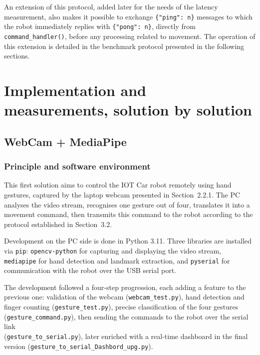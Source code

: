 \documentclass[12pt,a4paper]{report}
\begin{document}
	An extension of this protocol, added later for the needs of the latency measurement, also makes it possible to exchange \texttt{\{"ping": n\}} messages to which the robot immediately replies with \texttt{\{"pong": n\}}, directly from \texttt{command\_handler()}, before any processing related to movement. The operation of this extension is detailed in the benchmark protocol presented in the following sections.
	
	\newpage
	
	
\chapter{Implementation and measurements, solution by solution}
	\section{WebCam + MediaPipe}
	
	\subsection*{Principle and software environment}
	
	This first solution aims to control the IOT Car robot remotely using hand gestures, captured by the laptop webcam presented in Section~2.2.1. The PC analyses the video stream, recognises one gesture out of four, translates it into a movement command, then transmits this command to the robot according to the protocol established in Section~3.2.
	
	Development on the PC side is done in Python 3.11. Three libraries are installed via \texttt{pip}: \texttt{opencv-python} for capturing and displaying the video stream, \texttt{mediapipe} for hand detection and landmark extraction, and \texttt{pyserial} for communication with the robot over the USB serial port.
	
	The development followed a four-step progression, each adding a feature to the previous one: validation of the webcam (\texttt{webcam\_test.py}), hand detection and finger counting (\texttt{gesture\_test.py}), precise classification of the four gestures (\texttt{gesture\_command.py}), then sending the commands to the robot over the serial link \\ (\texttt{gesture\_to\_serial.py}), later enriched with a real-time dashboard in the final version (\texttt{gesture\_to\_serial\_Dashbord\_upg.py}).
	
\end{document}
